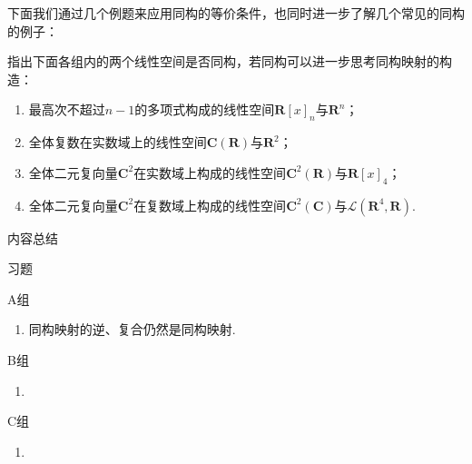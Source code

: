 下面我们通过几个例题来应用同构的等价条件，也同时进一步了解几个常见的同构的例子：
\begin{example}
    指出下面各组内的两个线性空间是否同构，若同构可以进一步思考同构映射的构造：
    \begin{enumerate}
        \item 最高次不超过$n-1$的多项式构成的线性空间$\mathbf{R}[x]_n$与$\mathbf{R}^n$；

        \item 全体复数在实数域上的线性空间$\mathbf{C}(\mathbf{R})$与$\mathbf{R}^2$；

        \item 全体二元复向量$\mathbf{C}^2$在实数域上构成的线性空间$\mathbf{C}^2(\mathbf{R})$与$\mathbf{R}[x]_4$；

        \item 全体二元复向量$\mathbf{C}^2$在复数域上构成的线性空间$\mathbf{C}^2(\mathbf{C})$与$\mathcal{L}(\mathbf{R}^4,\mathbf{R})$.
    \end{enumerate}
\end{example}
\begin{solution}

\end{solution}

\vspace{2ex}
\centerline{\heiti \Large 内容总结}

\vspace{2ex}

\centerline{\heiti \Large 习题}
\vspace{2ex}
{\kaishu }
\begin{flushright}
    \kaishu

\end{flushright}
\centerline{\heiti A组}
\begin{enumerate}
    \item 同构映射的逆、复合仍然是同构映射.
\end{enumerate}
\centerline{\heiti B组}
\begin{enumerate}
    \item
\end{enumerate}
\centerline{\heiti C组}
\begin{enumerate}
    \item
\end{enumerate}
